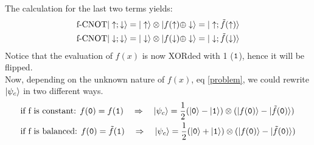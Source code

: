 The calculation for the last two terms yields:
\begin{equation}
  \begin{split}
    \text{f-CNOT}|\uparrow;\downarrow\rangle &=
    |\uparrow\rangle\otimes|f(\uparrow)\oplus \downarrow\rangle = |\uparrow;\tilde{f}(\uparrow)\rangle\\
    \text{f-CNOT}|\downarrow;\downarrow\rangle &=
    |\downarrow\rangle\otimes|f(\downarrow)\oplus \downarrow\rangle = |\downarrow;\tilde{f}(\downarrow)\rangle
  \end{split}
\end{equation}
Notice that the evaluation of $f(x)$ is now XORded with 1 ($\texttt{1}$), hence it will be flipped.\\

Now, depending on the unknown nature of $f(x)$, eq \eqref{problem}, we could rewrite $|\psi_c\rangle$ in two different ways.
\begin{equation}
  \begin{split}
    &\text{if f is constant:   }f(\texttt{0})=f(\texttt{1})\quad\Rightarrow\quad
    |\psi_c\rangle=
    \frac{1}{2}(|\texttt{0}\rangle-|\texttt{1}\rangle)\otimes
    (|f(\texttt{0})\rangle-|\tilde{f}(\texttt{0})\rangle)\\
    &\text{if f is balanced:   } f(\texttt{0})=\tilde{f}(\texttt{1})\quad\Rightarrow\quad
    |\psi_c\rangle=
    \frac{1}{2}(|\texttt{0}\rangle+|\texttt{1}\rangle)\otimes
    (|f(\texttt{0})\rangle-|\tilde{f}(\texttt{0})\rangle) \\
  \end{split}
\end{equation}


